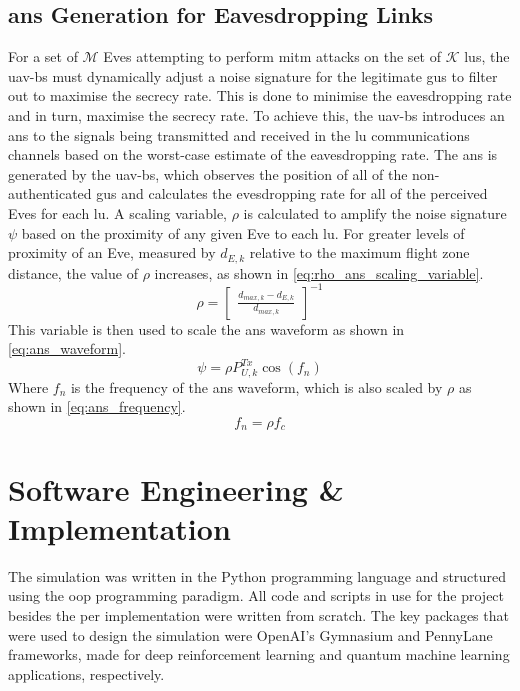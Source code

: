 \subsection{\texorpdfstring{\acrshort{ans}}{ANS} Generation for Eavesdropping Links}
For a set of $\mathcal{M}$ Eves attempting to perform \acrshort{mitm} attacks on the set of $\mathcal{K}$ \acrshort{lu}s, the \acrshort{uav}-\acrshort{bs} must dynamically adjust a noise signature for the legitimate \acrshort{gu}s to filter out to maximise the secrecy rate. 
This is done to minimise the eavesdropping rate and in turn, maximise the secrecy rate. 
To achieve this, the \acrshort{uav}-\acrshort{bs} introduces an \acrshort{ans} to the signals being transmitted and received in the \acrshort{lu} communications channels based on the worst-case estimate of the eavesdropping rate. 
The \acrshort{ans} is generated by the \acrshort{uav}-\acrshort{bs}, which observes the position of all of the non-authenticated \acrshort{gu}s and calculates the evesdropping rate for all of the perceived Eves for each \acrshort{lu}. 
A scaling variable, $\rho$ is calculated to amplify the noise signature $\psi$ based on the proximity of any given Eve to each \acrshort{lu}. 
For greater levels of proximity of an Eve, measured by $d_{E, k}$ relative to the maximum flight zone distance, the value of $\rho$ increases, as shown in \ref{eq:rho_ans_scaling_variable}. 
\begin{equation} \label{eq:rho_ans_scaling_variable}
   \rho = \begin{bmatrix}
       \frac{d_{max, k} - d_{E, k}}{d_{max, k}}
   \end{bmatrix} ^{-1}
\end{equation}
This variable is then used to scale the \acrshort{ans} waveform as shown in \ref{eq:ans_waveform}. 
\begin{equation} \label{eq:ans_waveform}
   \psi = \rho P_{U, k}^{Tx} \cos(f_{n})
\end{equation}
Where $f_{n}$ is the frequency of the \acrshort{ans} waveform, which is also scaled by $\rho$ as shown in \ref{eq:ans_frequency}.
\begin{equation} \label{eq:ans_frequency}
   f_{n} = \rho f_{c}
\end{equation}
\section{Software Engineering \& Implementation}
The simulation was written in the Python programming language and structured using the \acrfull{oop} programming paradigm.
All code and scripts in use for the project besides the \acrshort{per} implementation were written from scratch. 
The key packages that were used to design the simulation were OpenAI's Gymnasium and PennyLane frameworks, made for deep reinforcement learning and quantum machine learning applications, respectively. 

